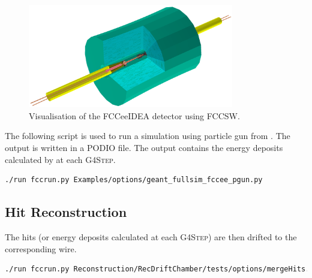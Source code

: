 \begin{figure}[!t]
\centering
\includegraphics[width=0.8\textwidth]{figures/FCCeeIDEA_IR}

\caption{Visualisation of the FCCeeIDEA detector using FCCSW.}
\label{fig_sim_vis}
\end{figure}

The following script is used to run a simulation using particle gun from . The output is written in a PODIO file. The output contains the energy deposits calculated by  at each \textsc{G4Step}.

\begin{lstlisting}[language=bash,caption={Particle gun simulation.}]
./run fccrun.py Examples/options/geant_fullsim_fccee_pgun.py
\end{lstlisting}

\subsection{Hit Reconstruction}

The hits (or energy deposits calculated at each \textsc{G4Step}) are then drifted to the corresponding wire.
\begin{lstlisting}[language=bash,caption={Reconstruction of the simulated hits for the drift chamber.}]
./run fccrun.py Reconstruction/RecDriftChamber/tests/options/mergeHits.py
\end{lstlisting}
